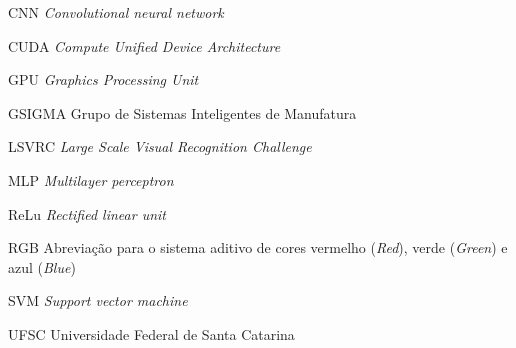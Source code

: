 
\begin{siglas}
    \item[CNN] \textit{Convolutional neural network}
    \item[CUDA] \textit{Compute Unified Device Architecture}
    \item[GPU] \textit{Graphics Processing Unit}
    \item[GSIGMA] Grupo de Sistemas Inteligentes de Manufatura
    \item[LSVRC] \textit{Large Scale Visual Recognition Challenge}
    \item[MLP] \textit{Multilayer perceptron}
    \item[ReLu] \textit{Rectified linear unit}
    \item[RGB] Abreviação para o sistema aditivo de cores vermelho (\textit{Red}), verde (\textit{Green}) e azul (\textit{Blue})
    \item[SVM] \textit{Support vector machine}
    \item[UFSC] Universidade Federal de Santa Catarina
\end{siglas}

